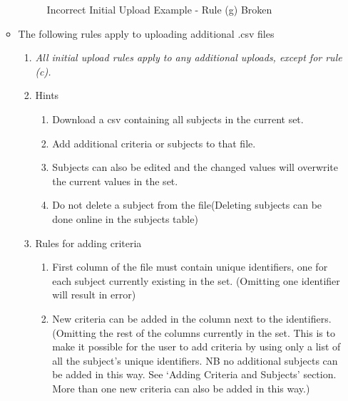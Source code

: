 \begin{enumerate}
\begin{itemize}
\begin{figure}[H]
	\caption{Incorrect Initial Upload Example - Rule (g) Broken}
\end{figure}
	\item The following rules apply to uploading additional .csv files
	\begin{enumerate}
		\item[] \textit{All initial upload rules apply to any additional uploads, except for rule (c).}
		\item Hints
		\begin{enumerate}
			\item Download a csv containing all subjects in the current set.
			\item Add additional criteria or subjects to that file. 
			\item Subjects can also be edited and the changed values will overwrite the current values in the set.
			\item Do not delete a subject from the file(Deleting subjects can be done online in the subjects table)
		\end{enumerate}
		\item Rules for adding criteria
		\begin{enumerate}
			\item First column of the file must contain unique identifiers, one for each subject currently existing in the 					set. (Omitting one identifier will result in error)
			\item New criteria can be added in the column next to the identifiers. (Omitting the rest of the columns 					currently in the set. This is to make it possible for the user to add criteria by using only a list of all the 					subject’s unique identifiers. NB no additional subjects can be added in this way. See ‘Adding Criteria and 					Subjects’ section. More than one new criteria can also be added in this way.)
		\end{enumerate}
	

\end{enumerate}
\end{itemize}
\end{enumerate}
